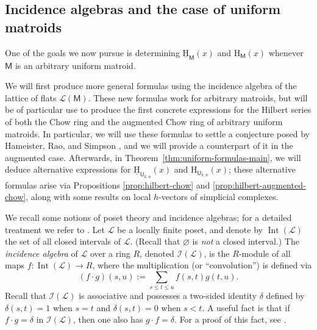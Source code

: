 \documentclass[11pt, a4paper, english]{amsart}
\theoremstyle{teoremas}
\theoremstyle{definition}
\newcommand{\M}{\mathsf{M}}
\newcommand{\U}{\mathsf{U}}
\renewcommand{\H}{\mathrm{H}}
\newcommand{\uH}{\underline{\mathrm{H}}}
\begin{document}
\subsection{Incidence algebras and the case of uniform matroids}\label{subsec:incidence-uniform}

One of the goals we now pursue is determining $\uH_{\M}(x)$ and $\H_{\M}(x)$ whenever $\M$ is an arbitrary uniform matroid. 

We will first produce more general formulas using the incidence algebra of the lattice of flats $\mathcal{L}(\M)$. These new formulas work for arbitrary matroids, but will be of particular use to produce the first concrete expressions for the Hilbert series of both the Chow ring and the augmented Chow ring of arbitrary uniform matroids. In particular, we will use these formulas to settle a conjecture posed by Hameister, Rao, and Simpson \cite[Conjecture 6.2]{hameister-rao-simpson}, and we will provide a counterpart of it in the augmented case. Afterwards, in Theorem~\ref{thm:uniform-formulas-main}, we will deduce alternative expressions for $\uH_{\U_{k,n}}(x)$ and $\H_{\U_{k,n}}(x)$; these alternative formulas arise via Propositions \ref{prop:hilbert-chow} and \ref{prop:hilbert-augmented-chow}, along with some results on local $h$-vectors of simplicial complexes. 

We recall some notions of poset theory and incidence algebras; for a detailed treatment we refer to \cite[Section 3.6]{stanley-ec1}. Let $\mathcal{L}$ be a locally finite poset, and denote by $\operatorname{Int}(\mathcal{L})$ the set of all  closed intervals of $\mathcal{L}$. (Recall that $\varnothing$ is \emph{not} a closed interval.) The \textit{incidence algebra} of $\mathcal{L}$ over a ring $R$, denoted $\mathcal{I}(\mathcal{L})$, is the $R$-module of all maps $f\colon\operatorname{Int}(\mathcal{L})\to R$, where the multiplication (or ``convolution'') is defined via
    \[ (f\cdot g)(s,u) := \sum_{s\leq t\leq u} f(s,t)g(t,u).\]
Recall that $\mathcal{I}(\mathcal{L})$ is associative and possesses a two-sided identity $\delta$ defined by $\delta(s,t) =1$ when $s=t$ and $\delta(s,t)=0$ when $s<t$. A useful fact is that if $f\cdot g=\delta$ in $\mathcal{I}(\mathcal{L})$, then one also has $g \cdot f=\delta$. For a proof 
 of this fact, see \cite[Proposition~3.6.2]{stanley-ec1}.
\end{document}
